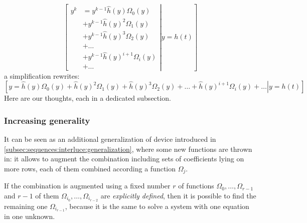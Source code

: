 \begin{displaymath}
    \left.\left[
            \begin{split}
                y^{k} &= y^{k-1}\hat{h}(y) \Omega_{0}(y) \\
                &+ y^{k-1}\hat{h}(y)^{2} \Omega_{1}(y) \\
                &+ y^{k-1}\hat{h}(y)^{3} \Omega_{2}(y) \\
                &+ \ldots\\ 
                &+ y^{k-1}\hat{h}(y)^{i+1} \Omega_{i}(y)\\
                &+ \ldots
            \end{split}
        \right| y = h(t) \right]
\end{displaymath}
a simplification rewrites:
\begin{displaymath}
    \left.\left[
        y = \hat{h}(y) \Omega_{0}(y) + 
        \hat{h}(y)^{2} \Omega_{1}(y) + \hat{h}(y)^{3} \Omega_{2}(y) +
        \ldots +
        \hat{h}(y)^{i+1} \Omega_{i}(y) + \ldots
        \right| y = h(t) \right]
\end{displaymath}
Here are our thoughts, each in a dedicated subsection.

\subsubsection{Increasing generality}
It can be seen as an additional generalization of device introduced in
\autoref{subsec:sequences:interluce:generalization},
where some new functions are thrown in: it allows to augment the
combination including sets of coefficients lying on more rows, 
each of them combined according a function $\Omega_{j}$. 

If the combination is augmented using a fixed number $r$ 
of functions $\Omega_{0},\ldots,\Omega_{r-1}$
and $r-1$ of them $\Omega_{i_{0}},\ldots,\Omega_{i_{r-2}}$
are \emph{explicitly defined}, then it is possible to find 
the remaining one $\Omega_{i_{r-1}}$, because it is the same to solve a system
with one equation in one unknown.


